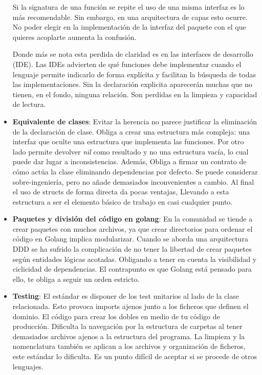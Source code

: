 \begin{itemize}
    Si la signatura de una función se repite el uso de una misma interfaz es lo más recomendable.
    Sin embargo, en una arquitectura de capas esto ocurre.
    No poder elegir en la implementación de la interfaz del paquete con el que quieres acoplarte aumenta la confusión.

    Donde más se nota esta perdida de claridad es en las interfaces de desarrollo (IDE).
    Las IDEs advierten de qué funciones debe implementar cuando el lenguaje permite indicarlo de forma explícita y facilitan la búsqueda de todas las implementaciones.
    Sin la declaración explicita aparecerán muchas que no tienen, en el fondo, ninguna relación.
    Son perdidas en la limpieza y capacidad de lectura.

    \item \textbf{Equivalente de clases}: Evitar la herencia no parece justificar la eliminación de la declaración de clase.
    Obliga a crear una estructura más compleja: una interfaz que oculte una estructura que implementa las funciones.
    Por otro lado permite devolver \textit{nil} como resultado y no una estructura vacía, lo cual puede dar lugar a inconsistencias.
    Además, Obliga a firmar un contrato de cómo actúa la clase eliminando dependencias por defecto.
    Se puede considerar sobre-ingeniería, pero no añade demasiados inconvenientes a cambio.
    Al final el uso de structs de forma directa da pocas ventajas, Llevando a esta estructura a ser el elemento básico de trabajo en casi cualquier punto.

    \item \textbf{Paquetes y división del código en golang}: En la comunidad se tiende a crear paquetes con muchos archivos, ya que crear directorios para ordenar el código en Golang implica modularizar.
    Cuando se aborda una arquitectura DDD se ha sufrido la complicación de no tener la libertad de crear paquetes según entidades lógicas acotadas.
    Obligando a tener en cuenta la visibilidad y ciclicidad de dependencias.
    El contrapunto es que Golang está pensado para ello, te obliga a seguir un orden estricto.

    \item \textbf{Testing}: El estándar es disponer de los test unitarios al lado de la clase relacionada.
    Esto provoca imports ajenos junto a los ficheros que definen el dominio.
    El código para crear los dobles en medio de tu código de producción.
    Dificulta la navegación por la estructura de carpetas al tener demasiados archivos ajenos a la estructura del programa.
    La limpieza y la nomenclatura también se aplican a los archivos y organización de ficheros, este estándar lo dificulta.
    Es un punto difícil de aceptar si se procede de otros lenguajes.
\end{itemize}

